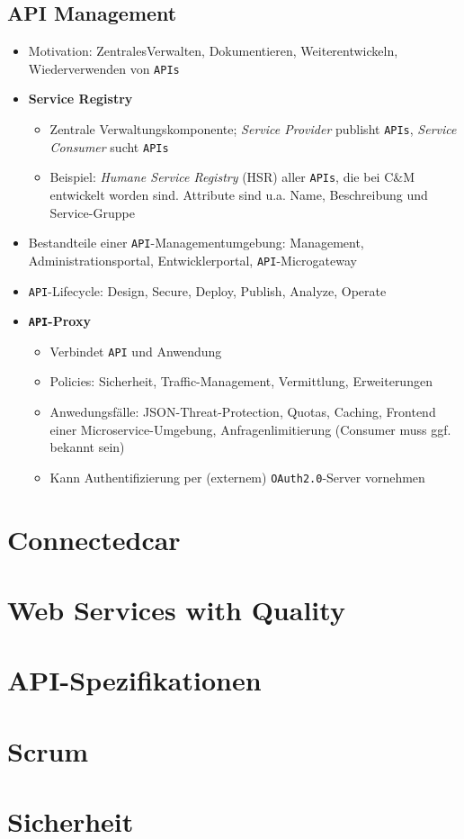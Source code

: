 \subsection{API Management}
\begin{itemize}
	\item Motivation: ZentralesVerwalten, Dokumentieren, Weiterentwickeln, Wiederverwenden von \texttt{APIs}
	\item \textbf{Service Registry}
	\begin{itemize}
		\item Zentrale Verwaltungskomponente; \textit{Service Provider} publisht \texttt{APIs}, \textit{Service Consumer} sucht \texttt{APIs}
		\item Beispiel: \textit{Humane Service Registry} (HSR) aller \texttt{APIs}, die bei C\&M entwickelt worden sind. Attribute sind u.a. Name, Beschreibung und Service-Gruppe
	\end{itemize}
	\item Bestandteile einer \texttt{API}-Managementumgebung: Management, Administrationsportal, Entwicklerportal, \texttt{API}-Microgateway
	\item \texttt{API}-Lifecycle: Design, Secure, Deploy, Publish, Analyze, Operate
	\item \textbf{\texttt{API}-Proxy}
	\begin{itemize}
		\item Verbindet \texttt{API} und Anwendung
		\item Policies: Sicherheit, Traffic-Management, Vermittlung, Erweiterungen
		\item Anwedungsfälle: JSON-Threat-Protection, Quotas, Caching, Frontend einer Microservice-Umgebung, Anfragenlimitierung (Consumer muss ggf. bekannt sein)
		\item Kann Authentifizierung per (externem) \texttt{OAuth2.0}-Server vornehmen
	\end{itemize}
\end{itemize}



\section{Connectedcar}



\section{Web Services with Quality}



\section{API-Spezifikationen}



\section{Scrum}



\section{Sicherheit}
